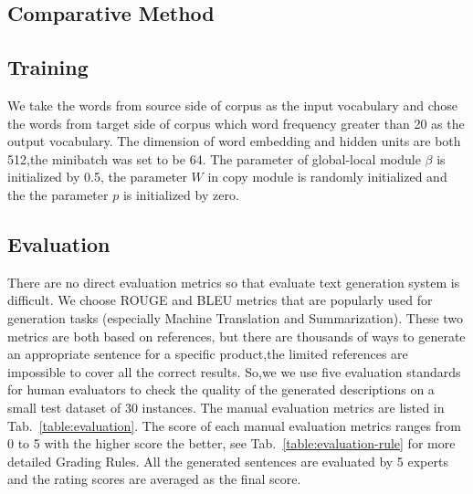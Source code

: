 \documentclass[sigconf]{acmart}
\begin{document}
\subsection{Comparative Method}

\subsection{Training}
We take the words from source side of corpus as the input vocabulary and chose the words from target side of corpus which word frequency greater than 20 as the output vocabulary. The dimension of word embedding and hidden units are both 512,the minibatch was set to be 64. The parameter of global-local module $\beta$ is initialized by 0.5, the parameter $W$ in copy module is randomly initialized and the the parameter $p$ is initialized by zero.

\subsection{Evaluation}
There are no direct evaluation metrics so that evaluate text generation system is difficult.  We choose ROUGE \cite{lin2004rouge} and BLEU \cite{papineni2002bleu} metrics that are popularly used for generation tasks (especially Machine Translation and Summarization). These two metrics are both based on references, but there are thousands of ways to generate an appropriate sentence for a specific product,the limited references are impossible to cover all the correct results. So,we we use five evaluation standards for human evaluators to check the quality of the generated descriptions on a small test dataset of 30 instances. The manual evaluation metrics are listed in Tab.~\ref{table:evaluation}. The score of each manual evaluation metrics ranges from 0 to 5 with the higher score the better, see Tab.~\ref{table:evaluation-rule} for more detailed Grading Rules. All the generated sentences are evaluated by 5 experts and the rating scores are averaged as the final score.
\end{document}

